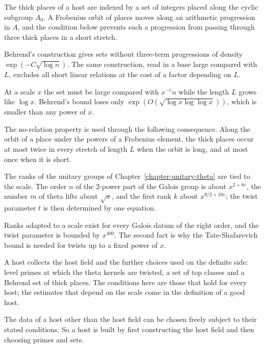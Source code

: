 The thick places of a host are indexed by a set of integers placed along the cyclic subgroup $A_0$.
A Frobenius orbit of places moves along an arithmetic progression in $A$, and the condition below
prevents such a progression from passing through three thick places in a short stretch.

Behrend's construction gives sets without three-term progressions of density
$\exp(-C\sqrt{\log n})$. The same construction, read in a base large compared with $L$, excludes all
short linear relations at the cost of a factor depending on $L$.

At a scale $x$ the set must be large compared with $x^{-\varepsilon}n$ while the length $L$ grows
like $\log x$. Behrend's bound loses only $\exp(O(\sqrt{\log x\log\log x}))$, which is smaller than any
power of $x$.

The no-relation property is used through the following consequence. Along the orbit of a place
under the powers of a Frobenius element, the thick places occur at most twice in every stretch of length $L$ when the
orbit is long, and at most once when it is short.

The ranks of the unitary groups of Chapter~\ref{chapter-unitary-theta} are tied to the scale. The
order $n$ of the $2$-power part of the Galois group is about $x^{2+8\varepsilon}$, the number $m$
of theta lifts about $\sqrt x$, and the first rank $k$ about $x^{9/2+10\varepsilon}$; the twist
parameter $t$ is then determined by one equation.

Ranks adapted to a scale exist for every Galois datum of the right order, and the twist parameter is
bounded by $x^{400}$. The second fact is why the Tate-Shafarevich bound is needed for twists up to a
fixed power of $x$.

A host collects the host field and the further choices used on the definite side: level primes at
which the theta kernels are twisted, a set of top classes and a Behrend set of thick places. The
conditions here are those that hold for every host; the estimates that depend on the scale come in
the definition of a good host.

The data of a host other than the host field can be chosen freely subject to their stated
conditions. So a host is built by first constructing the host field and then choosing primes and
sets.

